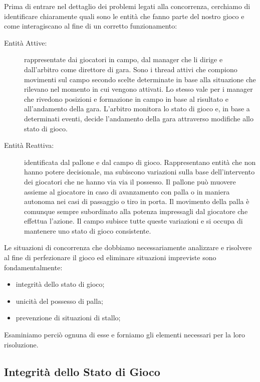 \documentclass[aps,letterpaper,10pt]{article}
\begin{document}
Prima di entrare nel dettaglio dei problemi legati alla concorrenza, cerchiamo di identificare chiaramente quali sono le
entit\`a che fanno parte del nostro gioco e come interagiscano al fine di un corretto funzionamento:

\begin{description}
\item[Entit\`a Attive:] rappresentate dai giocatori in campo, dal manager che li dirige e dall'arbitro come direttore di
gara. Sono i thread attivi che compiono movimenti sul campo secondo scelte determinate in base alla situazione che
rilevano nel momento in cui vengono attivati. Lo stesso vale per i manager che rivedono posizioni e formazione in campo
in base al risultato e all'andamento della gara. L'arbitro monitora lo stato di gioco e, in base a determinati eventi,
decide l'andamento della gara attraverso modifiche allo stato di gioco.
\item[Entit\`a Reattiva:] identificata dal pallone e dal campo di gioco. Rappresentano entit\`a che non hanno potere
decisionale, ma subiscono variazioni sulla base dell'intervento dei giocatori che ne hanno via via il possesso. Il
pallone pu\`o muovere assieme al giocatore in caso di avanzamento con palla o in maniera autonoma nei casi di passaggio
o tiro in porta. Il movimento della palla \`e comunque sempre subordinato alla potenza impressagli dal giocatore che
effettua l'azione. Il campo subisce tutte queste variazioni e si occupa di mantenere uno stato di gioco consistente.
\end{description}

Le situazioni di concorrenza che dobbiamo necessariamente analizzare e risolvere al fine di perfezionare il gioco ed
eliminare situazioni impreviste sono fondamentalmente:

\begin{itemize}
	\item integrit\`a dello stato di gioco;
	\item unicit\`a del possesso di palla;
	\item prevenzione di situazioni di stallo;
\end{itemize}

Esaminiamo perci\`o ognuna di esse e forniamo gli elementi necessari per la loro risoluzione.

\subsection{Integrit\`a dello Stato di Gioco}
\label{statodigioco}
\end{document}
